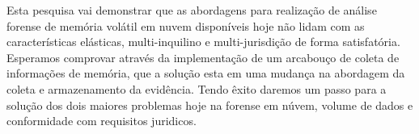 \documentclass[12pt,				%
	openright,			%
	oneside,			%
	a4paper,			%
	english,			%
	brazil				%
	]{abntex2}
\begin{document}
\pagebreak

%
%

%


\setlength{\absparsep}{18pt} %
\begin{resumo}
Esta pesquisa vai demonstrar que as abordagens para realização de análise forense de memória volátil em nuvem disponíveis hoje não lidam com as características elásticas, 
multi-inquilino e multi-jurisdição de forma satisfatória. Esperamos comprovar através da implementação de um arcabouço de coleta de informações de memória, que a solução
esta em uma mudança na abordagem da coleta e armazenamento da evidência. Tendo êxito daremos um passo para a solução dos dois maiores problemas hoje na forense em núvem, 
volume de dados e conformidade com requisitos juridicos.

 

\end{resumo}

%
%  



\end{document}
